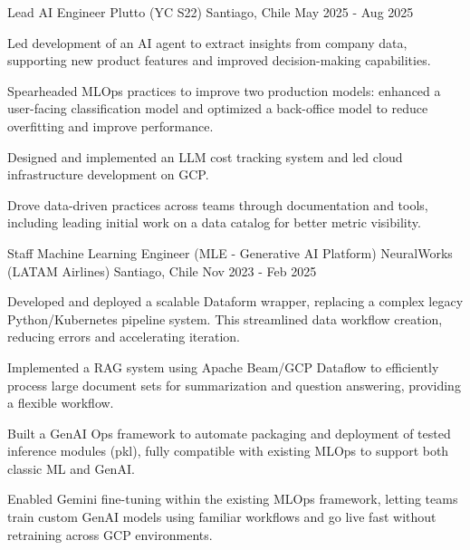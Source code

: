 \cventry
{Lead AI Engineer}
{Plutto (YC S22)}
{Santiago, Chile}
{May 2025 - Aug 2025}
{
  \begin{cvitems}
    \item Led development of an AI agent to extract insights from company data, supporting new product features and improved decision-making capabilities.
    \item Spearheaded MLOps practices to improve two production models: enhanced a user-facing classification model and optimized a back-office model to reduce overfitting and improve performance.
    \item Designed and implemented an LLM cost tracking system and led cloud infrastructure development on GCP.
    \item Drove data-driven practices across teams through documentation and tools, including leading initial work on a data catalog for better metric visibility.
  \end{cvitems}
}

\cventry
{Staff Machine Learning Engineer (MLE - Generative AI Platform)}
{NeuralWorks (LATAM Airlines)}
{Santiago, Chile}
{Nov 2023 - Feb 2025}
{
  \begin{cvitems}
    \item Developed and deployed a scalable Dataform wrapper, replacing a complex legacy Python/Kubernetes pipeline system. This streamlined data workflow creation, reducing errors and accelerating iteration.
    \item Implemented a RAG system using Apache Beam/GCP Dataflow to efficiently process large document sets for summarization and question answering, providing a flexible workflow.
    \item Built a GenAI Ops framework to automate packaging and deployment of tested inference modules (pkl), fully compatible with existing MLOps to support both classic ML and GenAI.
    \item Enabled Gemini fine-tuning within the existing MLOps framework, letting teams train custom GenAI models using familiar workflows and go live fast without retraining across GCP environments.
  \end{cvitems}
}

